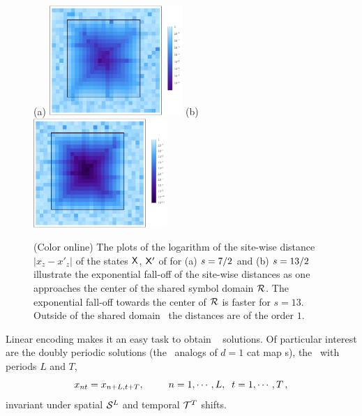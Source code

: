\documentclass[12pt]{iopart}
\begin{document}
\begin{figure} %
\begin{center}
(a) \includegraphics[width=0.45\textwidth]
{AKSLPS12} %
(b) \includegraphics[width=0.45\textwidth]
{AKSLPS12_1} %
\end{center}
\caption[]{\label{fig:AKSLPS12}
(Color online)
The plots of the logarithm of the site-wise distance
\(|x_{z}-x'_{z}|\) of the states $\mathsf{X}$, $\mathsf{X}'$ of
 for
(a)
$s=7/2$  and
(b) $s=13/2$
illustrate the exponential fall-off of the site-wise distances as one
approaches the center of the shared symbol domain ${\mathcal{R}}$.  The
exponential fall-off towards the center of ${\mathcal{R}}$ is faster for $s=13$.
Outside of the shared domain \R\ the distances are of the order $1$.
}
\end{figure}

Linear encoding makes it an easy task to obtain \catlatt\
 solutions. Of particular interest are the doubly
periodic solutions (the \spt\ analogs of $d\!=\!1$ cat map \po s), the
\twots\ with periods $L$ and $T$,
\[
          x_{nt} = x_{n+L,t+T},
\hspace*{25pt}    n=1,\cdots ,L,\;\; t=1,\cdots,T
\,,
\]
invariant under  spatial $\mathcal{S}^L$  and temporal $\mathcal{T}^T$ shifts.
\end{document}
